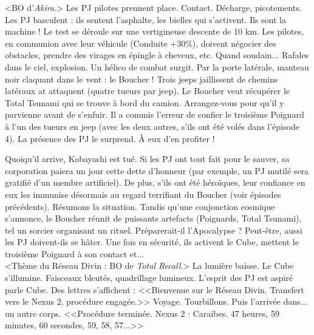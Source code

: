 \documentclass[11pt,twoside,a4paper]{book}
\begin{document}
<BO d'\emph{Akira}.> Les PJ pilotes prennent place. Contact. D{\'e}charge, picotements. Les PJ basculent : ils sentent l'asphalte, les bielles qui s'activent. Ils sont la machine ! Le test se d{\'e}roule sur une vertigineuse descente de 10 km. Les pilotes, en communion avec leur v{\'e}hicule (Conduite +30\%), doivent n{\'e}gocier des obstacles, prendre des virages en {\'e}pingle {\`a} cheveux, etc. Quand soudain... Rafales dans le ciel, explosion. Un h{\'e}lico de combat surgit. Par la porte lat{\'e}rale, manteau noir claquant dans le vent : le Boucher ! Trois jeeps jaillissent de chemins lat{\'e}raux at attaquent (quatre tueurs par jeep). Le Boucher veut r{\'e}cup{\'e}rer le Total Tsunami qui se trouve {\`a} bord du camion. Arrangez-vous pour qu'il y parvienne avant de s'enfuir. Il a commis l'erreur de confier le troisi{\`e}me Poignard {\`a} l'un des tueurs en jeep (avec les deux autres, s'ils ont {\'e}t{\'e} vol{\'e}s dans l'{\'e}pisode 4). La pr{\'e}sence des PJ le surprend. {\`A} eux d'en profiter !~\\

\clearpage

Quoiqu'il arrive, Kobayashi est tu{\'e}. Si les PJ ont tout fait pour le sauver, sa corporation paiera un jour cette dette d'honneur (par exemple, un PJ mutil{\'e} sera gratifi{\'e} d'un membre artificiel). De plus, s'ils ont {\'e}t{\'e} h{\'e}ro{\"i}ques, leur confiance en eux les immunise d{\'e}sormais au regard terrifiant du Boucher (voir {\'e}pisodes pr{\'e}c{\'e}dents). R{\'e}sumons la situation. Tandis qu'une conjonction cosmique s'annonce, le Boucher r{\'e}unit de puissants artefacts (Poignards, Total Tsunami), tel un sorcier organisant un rituel. Pr{\'e}parerait-il l'Apocalypse ? Peut-{\^e}tre, aussi les PJ doivent-ils se h{\^a}ter. Une fois en s{\'e}curit{\'e}, ils activent le Cube, mettent le troisi{\`e}me Poignard {\`a} son contact et...~\\

<Th{\`e}me du R{\'e}seau Divin : BO de \emph{Total Recall}.> La lumi{\`e}re baisse. Le Cube s'illumine. Faisceaux bleut{\'e}s, quadrillage lumineux. L'esprit des PJ est aspir{\'e} parle Cube. Des lettres s'affichent : <<Bienvenue sur le R{\'e}seau Divin. Transfert vers le Nexus 2, proc{\'e}dure engag{\'e}e.>> Voyage. Tourbillons. Puis l'arriv{\'e}e dans... un autre corps. <<Proc{\'e}dure termin{\'e}e. Nexus 2 : Cara{\"i}bes. 47 heures, 59 minutes, 60 secondes, 59, 58, 57...>>~\\

\clearpage
\end{document}
